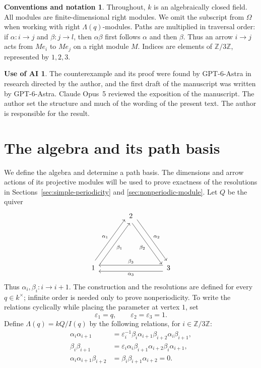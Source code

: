 \documentclass[a4paper,reqno,10pt]{amsart}
\theoremstyle{definition}
\newtheorem*{conventions}{Conventions and notation}
\newtheorem*{aiuse}{Use of AI}
\numberwithin{equation}{section}
\newcommand{\kfield}{k}
\begin{document}
\begin{conventions}
Throughout, $\kfield$ is an algebraically closed field. All modules are
finite-dimensional right modules. We omit the subscript from $\Omega$
when working with right $\Lambda(q)$-modules. Paths are multiplied in
traversal order: if $\alpha:i\to j$ and $\beta:j\to l$, then
$\alpha\beta$ first follows $\alpha$ and then $\beta$. Thus an arrow
$i\to j$ acts from $Me_i$ to $Me_j$ on a right module $M$. Indices are
elements of $\mathbb Z/3\mathbb Z$, represented by $1,2,3$.
\end{conventions}

\begin{aiuse}
The counterexample and its proof were found by GPT-6-Astra in research directed
by the author, and the first draft of the manuscript was written by
GPT-6-Astra. Claude Opus~5 reviewed the exposition of the manuscript. The
author set the structure and much of the wording of the present text. The
author is responsible for the result.
\end{aiuse}

\section{The algebra and its path basis}
\label{sec:algebra}

We define the algebra and determine a path basis. The dimensions and arrow
actions of its projective modules will be used to prove exactness of the
resolutions in Sections~\ref{sec:simple-periodicity} and
\ref{sec:nonperiodic-module}. Let $Q$ be the quiver
\[
\begin{tikzcd}[column sep=4em,row sep=6em,
  arrows={shorten <=1pt,shorten >=1pt}]
 & 2
   \arrow[dr,shift left=1ex,"\alpha_2"]
   \arrow[dr,shift right=1ex,"\beta_2"'] & \\
 1
   \arrow[ur,shift left=1ex,"\alpha_1"]
   \arrow[ur,shift right=1ex,"\beta_1"']
 && 3
   \arrow[ll,shift left=1ex,"\alpha_3"]
   \arrow[ll,shift right=1ex,"\beta_3"']
\end{tikzcd}
\]
Thus $\alpha_i,\beta_i:i\to i+1$. The construction and the resolutions
are defined for every $q\in\kfield^\times$; infinite order is needed
only to prove nonperiodicity. To write the relations cyclically while
placing the parameter at vertex $1$, set
\[
 \varepsilon_1=q,\qquad \varepsilon_2=\varepsilon_3=1.
\]
Define $\Lambda(q)=\kfield Q/I(q)$ by the following relations, for
$i\in\mathbb Z/3\mathbb Z$:
\begin{align}
 \alpha_i\alpha_{i+1}
 &=
 \varepsilon_i^{-1}
 \beta_i\alpha_{i+1}\beta_{i+2}\alpha_i\beta_{i+1},
 \label{eq:alpha-relation}\\
 \beta_i\beta_{i+1}
 &=
 \varepsilon_i
 \alpha_i\beta_{i+1}\alpha_{i+2}\beta_i\alpha_{i+1},
 \label{eq:beta-relation}\\
 \alpha_i\alpha_{i+1}\beta_{i+2}
 &=
 \beta_i\beta_{i+1}\alpha_{i+2}=0.
 \label{eq:zero-relations}
\end{align}
\end{document}
